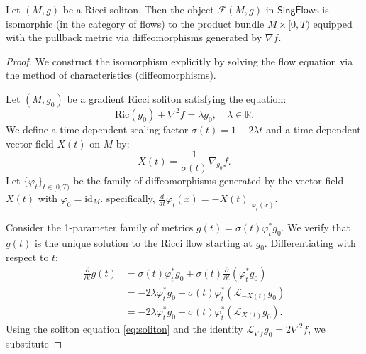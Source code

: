 \documentclass[10pt,a4paper]{amsart}
\newcommand{\SingFlows}{\mathsf{SingFlows}}
\begin{document}
\begin{proposition}
Let $(M, g)$ be a Ricci soliton. Then the object $\mathcal{F}(M, g)$ in $\SingFlows$ is isomorphic (in the category of flows) to the product bundle $M \times [0, T)$ equipped with the pullback metric via diffeomorphisms generated by $\nabla f$.
\end{proposition}

\begin{proof}
We construct the isomorphism explicitly by solving the flow equation via the method of characteristics (diffeomorphisms).

Let $(M, g_0)$ be a gradient Ricci soliton satisfying the equation:
\begin{equation} \label{eq:soliton}
\mathrm{Ric}(g_0) + \nabla^2 f = \lambda g_0, \quad \lambda \in \mathbb{R}.
\end{equation}
We define a time-dependent scaling factor $\sigma(t) = 1 - 2\lambda t$ and a time-dependent vector field $X(t)$ on $M$ by:
\[ X(t) = \frac{1}{\sigma(t)} \nabla_{g_0} f. \]
Let $\{\varphi_t\}_{t \in [0, T)}$ be the family of diffeomorphisms generated by the vector field $X(t)$ with $\varphi_0 = \mathrm{id}_M$. specifically, $\frac{d}{dt}\varphi_t(x) = -X(t)|_{\varphi_t(x)}$.

Consider the 1-parameter family of metrics $g(t) = \sigma(t) \varphi_t^* g_0$. We verify that $g(t)$ is the unique solution to the Ricci flow starting at $g_0$.
Differentiating with respect to $t$:
\begin{align*}
\frac{\partial}{\partial t} g(t) &= \dot{\sigma}(t) \varphi_t^* g_0 + \sigma(t) \frac{\partial}{\partial t} (\varphi_t^* g_0) \\
&= -2\lambda \varphi_t^* g_0 + \sigma(t) \varphi_t^* (\mathcal{L}_{-X(t)} g_0) \\
&= -2\lambda \varphi_t^* g_0 - \sigma(t) \varphi_t^* (\mathcal{L}_{X(t)} g_0).
\end{align*}
Using the soliton equation \eqref{eq:soliton} and the identity $\mathcal{L}_{\nabla f} g_0 = 2\nabla^2 f$, we substitute 


\end{proof}
\end{document}
